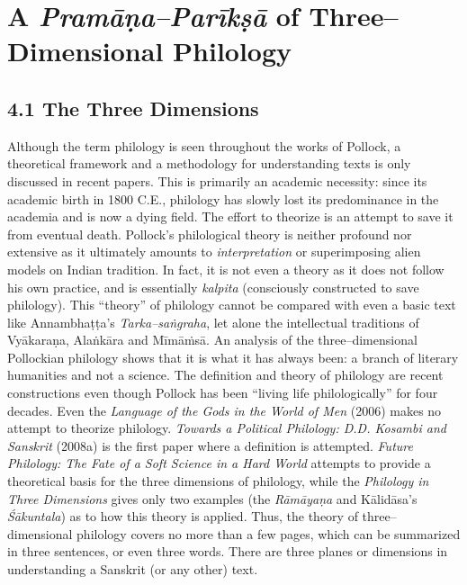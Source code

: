 
\chapter{A {\it {\bfseries Pramāṇa–Parīkṣā}} of Three–Dimensional Philology}\label{chapter4}

\section*{4.1 The Three Dimensions}

Although the term philology is seen throughout the works of Pollock, a theoretical framework and a methodology for understanding texts is only discussed in recent papers. This is primarily an academic necessity: since its academic birth in 1800 C.E., philology has slowly lost its predominance in the academia and is now a dying field. The effort to theorize is an attempt to save it from eventual death. Pollock’s philological theory is neither profound nor extensive as it ultimately amounts to \textit{interpretation} or superimposing alien models on Indian tradition. In fact, it is not even a theory as it does not follow his own practice, and is essentially \textit{kalpita} (consciously constructed to save philology). This “theory” of philology cannot be compared with even a basic text like Annambhaṭṭa’s \textit{Tarka–saṅgraha}, let alone the intellectual traditions of Vyākaraṇa, Alaṅkāra and Mīmāṁsā. An analysis of the three–dimensional Pollockian philology shows that it is what it has always been: a branch of literary humanities and not a science. The definition and theory of philology are recent constructions even though Pollock has been “living life philologically” for four decades. Even the \textit{Language of the Gods in the World of Men} (2006) makes no attempt to theorize philology. \textit{Towards a Political Philology: D.D. Kosambi and Sanskrit} (2008a) is the first paper where a definition is attempted. \textit{Future Philology: The Fate of a Soft Science in a Hard World} attempts to provide a theoretical basis for the three dimensions of philology, while the \textit{Philology in Three Dimensions} gives only two examples (the \textit{Rāmāyaṇa} and Kālidāsa’s \textit{Śākuntala}) as to how this theory is applied. Thus, the theory of three–dimensional philology covers no more than a few pages, which can be summarized in three sentences, or even three words. There are three planes or dimensions in understanding a Sanskrit (or any other) text.


